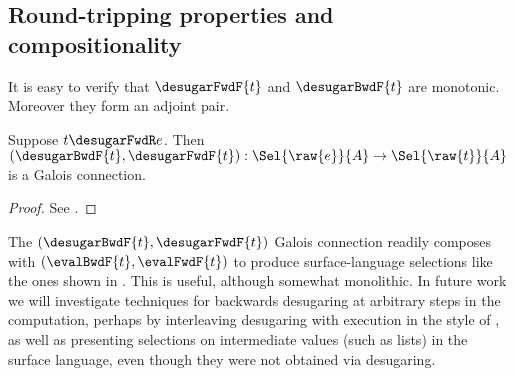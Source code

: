 \subsection{Round-tripping properties and compositionality}

It is easy to verify that $\desugarFwdF{t}$ and $\desugarBwdF{t}$ are monotonic. Moreover they form an adjoint pair.

\begin{theorem}
  \label{thm:surface-language:desugar:gc}
     Suppose $t \desugarFwdR e$. Then $(\desugarBwdF{t}, \desugarFwdF{t}): \Sel{\raw{e}}{A} \to \Sel{\raw{t}}{A}$ is a Galois connection.
\end{theorem}

\begin{proof}
   \ifappendices See . \else \ProofInSupplementaryMaterial \fi
\end{proof}

\noindent The $(\desugarBwdF{t}, \desugarFwdF{t})$ Galois connection readily composes with $(\evalBwdF{t}, \evalFwdF{t})$ to produce surface-language selections like the ones shown in . This is useful, although somewhat monolithic. In future work we will investigate techniques for backwards desugaring at arbitrary steps in the computation, perhaps by interleaving desugaring with execution in the style of \citet{pombrio14}, as well as presenting selections on intermediate values (such as lists) in the surface language, even though they were not obtained via desugaring.
